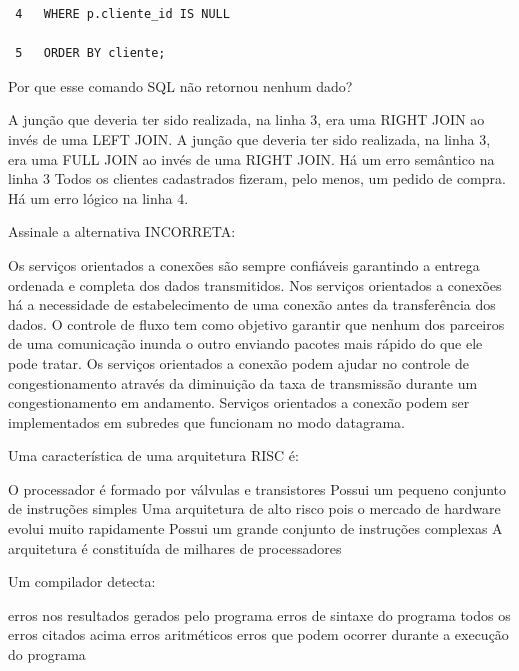 \documentclass[12pt, addpoints]{exam}
\begin{document}
\begin{questions}
\begin{tcolorbox}
\begin{verbatim}
 4   WHERE p.cliente_id IS NULL

 5   ORDER BY cliente;

 \end{verbatim}

\end{tcolorbox}

Por que esse comando SQL não retornou nenhum dado?


\begin{choices}
\choice A junção que deveria ter sido realizada, na linha 3, era uma RIGHT JOIN ao invés de uma LEFT JOIN.
\choice A junção que deveria ter sido realizada, na linha 3, era uma FULL JOIN ao invés de uma RIGHT JOIN.
\choice Há um erro semântico na linha 3
\choice Todos os clientes cadastrados fizeram, pelo menos, um pedido de compra.
\choice Há um erro lógico na linha 4.
\end{choices}

\question

Assinale a alternativa INCORRETA:


\begin{choices}
\choice Os serviços orientados a conexões são sempre confiáveis garantindo a entrega ordenada e completa dos dados transmitidos.
\choice Nos serviços orientados a conexões há a necessidade de estabelecimento de uma conexão antes da transferência dos dados.
\choice O controle de fluxo tem como objetivo garantir que nenhum dos parceiros de uma comunicação inunda o outro enviando pacotes mais rápido do que ele pode tratar.
\choice Os serviços orientados a conexão podem ajudar no controle de congestionamento através da diminuição da taxa de transmissão durante um congestionamento em andamento.
\choice Serviços orientados a conexão podem ser implementados em subredes que funcionam no modo datagrama.
\end{choices}

\question

Uma característica de uma arquitetura RISC é:
\begin{choices}
\choice O processador é formado por válvulas e transistores
\choice Possui um pequeno conjunto de instruções simples
\choice Uma arquitetura de alto risco pois o mercado de hardware evolui muito rapidamente
\choice Possui um grande conjunto de instruções complexas
\choice A arquitetura é constituída de milhares de processadores
\end{choices}

\question

Um compilador detecta:
\begin{choices}
\choice erros nos resultados gerados pelo programa
\choice erros de sintaxe do programa 
\choice todos os erros citados acima
\choice erros aritméticos
\choice erros que podem ocorrer durante a execução do programa
\end{choices}


\end{questions}
\end{document}
